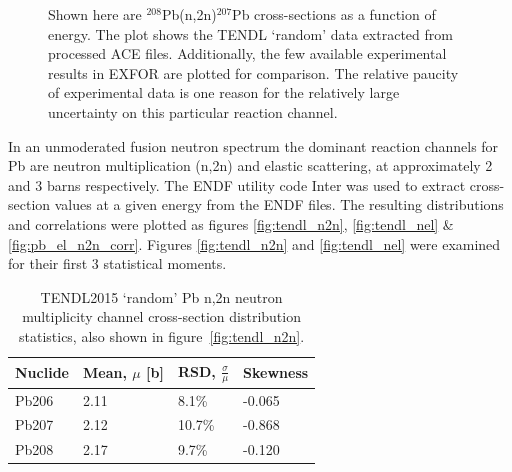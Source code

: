 \begin{figure}[H]
  \centering
  \caption[Cross-section and uncertainty data for the $^{208}$Pb(n,2n)$^{207}$Pb reaction.]{Shown here are $^{208}$Pb(n,2n)$^{207}$Pb cross-sections as a function of energy. The plot shows the TENDL `random' data extracted from processed ACE files. Additionally, the few available experimental results in EXFOR are plotted for comparison. The relative paucity of experimental data is one reason for the relatively large uncertainty on this particular reaction channel.}
  \label{fig:tendl_lead}
\end{figure}

In an unmoderated fusion neutron spectrum the dominant reaction channels for Pb are neutron multiplication (n,2n) and elastic scattering, at approximately 2 and 3 barns respectively. The ENDF utility code Inter was used to extract cross-section values at a given energy from the ENDF files. The resulting distributions and correlations were plotted as figures \ref{fig:tendl_n2n}, \ref{fig:tendl_nel} \& \ref{fig:pb_el_n2n_corr}. Figures \ref{fig:tendl_n2n} and \ref{fig:tendl_nel} were examined for their first 3 statistical moments. 

\begin{table}[H]
  \footnotesize
  \centering 
  \begin{tabular}{llll}
    \toprule
    Nuclide & Mean, $\mu$ [b] & RSD, $\frac{\sigma}{\mu}$ & Skewness \\
    \midrule
    Pb206 & 2.11 & 8.1\% & -0.065 \\
    Pb207 & 2.12 & 10.7\% & -0.868 \\
    Pb208 & 2.17 & 9.7\% & -0.120 \\
    \bottomrule
  \end{tabular}
  \caption[Statistical moments of $^{208}$Pb(n,2n)$^{207}$Pb data in TENDL2015.]{TENDL2015 `random' Pb n,2n neutron multiplicity channel cross-section distribution statistics, also shown in figure~\ref{fig:tendl_n2n}.}
  \label{table:n2n}
\end{table}

